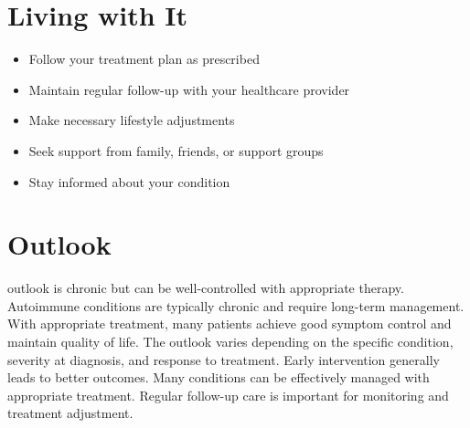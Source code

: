 \section{Living with It}
\begin{itemize}[noitemsep]
  \item Follow your treatment plan as prescribed
  \item Maintain regular follow-up with your healthcare provider
  \item Make necessary lifestyle adjustments
  \item Seek support from family, friends, or support groups
  \item Stay informed about your condition
\end{itemize}
\section{Outlook}
outlook is chronic but can be well-controlled with appropriate therapy. Autoimmune conditions are typically chronic and require long-term management. With appropriate treatment, many patients achieve good symptom control and maintain quality of life. The outlook varies depending on the specific condition, severity at diagnosis, and response to treatment. Early intervention generally leads to better outcomes. Many conditions can be effectively managed with appropriate treatment. Regular follow-up care is important for monitoring and treatment adjustment.
